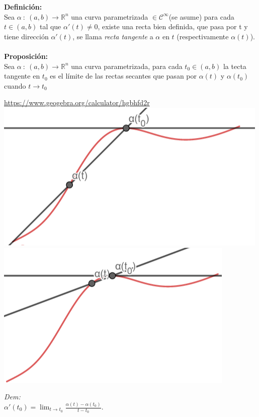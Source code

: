 \documentclass{article}
\begin{document}

\textbf{Definición:}\\
Sea $\alpha\::\:(a,b)\longrightarrow\mathbb{R}^n$ una curva parametrizada $\in\mathcal{C}^\infty$(se asume) para cada $t\in(a,b)$ tal que $\alpha'(t)\ne0$, existe una recta bien definida, que pasa por t y tiene dirección $\alpha'(t)$, se llama \textit{recta tangente} a $\alpha$ en $t$ (respectivamente $\alpha(t)$).\\\\


\textbf{Proposición:}\\
Sea $\alpha\::\:(a,b)\longrightarrow\mathbb{R}^n$ una curva parametrizada, para cada $t_0 \in (a,b)$ la tecta tangente en $t_0$ es el límite de las rectas secantes que pasan por $\alpha(t)$ y $\alpha(t_0)$ cuando $t\to t_0$
\begin{center}
    \url{https://www.geogebra.org/calculator/hgbhfd2r}\\
    \includegraphics[scale=0.5]{figuras/limite secantes/limite secantes 1.PNG}
    \includegraphics[scale=0.5]{figuras/limite secantes/limitew secantes 2.PNG}
\end{center}
\textit{Dem:}\\
$\alpha'(t_0)=\lim_{t\to t_0} \frac{\alpha(t)-\alpha(t_0)}{t-t_0}$.\\\\
\end{document}
